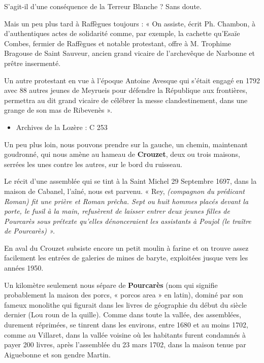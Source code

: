 S’agit-il d’une conséquence de la Terreur Blanche ? Sans doute.

\vspace{0.2cm}

Mais un peu plus tard à Raffègues toujours : « On assiste, écrit Ph. Chambon, à d’authentiques
actes de solidarité comme, par exemple, la cachette qu’Esaïe Combes, fermier de Raffègues et
notable protestant, offre à M. Trophime Bragouse de Saint Sauveur, ancien grand vicaire de
l’archevêque de Narbonne et prêtre insermenté.

Un autre protestant en vue à l’époque Antoine Avesque qui s’était engagé en 1792 avec 88
autres jeunes de Meyrueis pour défendre la République aux frontières, permettra au dit grand
vicaire de célébrer la messe clandestinement, dans une grange de son mas de Ribevenès ».

\vspace{0.3cm}

\begin{itemize}
    \item Archives de la Lozère : C 253
\end{itemize}


Un peu plus loin, nous pouvons prendre sur la gauche, un chemin, maintenant goudronné, qui
nous amène au hameau de \textbf{Crouzet}, deux ou trois maisons, serrées les unes contre les autres,
sur le bord du ruisseau.

Le récit d’une assemblée qui se tint à la Saint Michel 29 Septembre 1697, dans la maison de
Cabanel, l’aîné, nous est parvenu. « Rey, \textit{(compagnon du prédicant Roman) fit une prière et
Roman prêcha. Sept ou huit hommes placés devant la porte, le fusil à la main, refusèrent de
laisser entrer deux jeunes filles de Pourcarès sous prétexte qu’elles dénonceraient les
assistants à Poujol (le traître de Pourcarès) ».}

\vspace{0.2cm}

En aval du Crouzet subsiste encore un petit moulin à farine et on trouve assez facilement les
entrées de galeries de mines de baryte, exploitées jusque vers les années 1950.

\vspace{0.2cm}

Un kilomètre seulement nous sépare de \textbf{Pourcarès} (nom qui signifie probablement la maison
des porcs, « porcos area » en latin), dominé par son fameux monolithe qui figurait dans les
livres de géographie du début du siècle dernier (Lou roun de la quille). Comme dans toute la
vallée, des assemblées, durement réprimées, se tinrent dans les environs, entre 1680 et au
moins 1702, comme au Villaret, dans la vallée voisine où les habitants furent condamnés à
payer 200 livres, après l’assemblée du 23 mars 1702, dans la maison tenue par Aiguebonne et
son gendre Martin.

